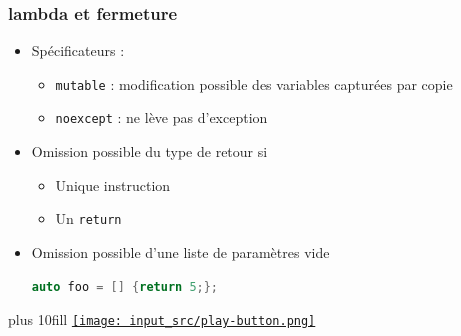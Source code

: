 \documentclass[C++.tex]{subfiles}
\begin{document}
\begin{frame}[fragile]
	\frametitle{lambda et fermeture}
	\begin{itemize}
		\item Spécificateurs :
		\begin{itemize}
			\item \lstinline|mutable| : modification possible des variables capturées par copie
			\item \lstinline|noexcept| : ne lève pas d'exception
		\end{itemize}

		\item Omission possible du type de retour si
		\begin{itemize}
			\item Unique instruction
			\item Un \lstinline|return|
		\end{itemize}
	
	
		\item Omission possible d'une liste de paramètres vide


\begin{lstlisting}[language=C++]
auto foo = [] {return 5;};\end{lstlisting}
	\end{itemize}

	\vskip 10mm plus 10fill
	\hfill
	\href{https://godbolt.org/#g:!((g:!((g:!((h:codeEditor,i:(filename:'1',fontScale:14,fontUsePx:'0',j:1,lang:c%2B%2B,selection:(endColumn:1,endLineNumber:29,positionColumn:1,positionLineNumber:29,selectionStartColumn:1,selectionStartLineNumber:29,startColumn:1,startLineNumber:29),source:'%23include+%3Ciostream%3E%0A%23include+%3Cvector%3E%0A%23include+%3Calgorithm%3E%0A%0Ausing+std::begin%3B%0Ausing+std::end%3B%0A%0Aint+main()%0A%7B%0A++%7B%0A++++int+bar+%3D+4%3B%0A++++auto+foo+%3D+%5B%26bar%5D+(int+a)+-%3E+int+%7B+bar+*%3D+a%3B+return+3+*+a%3B%7D%3B%0A%0A++++std::cout+%3C%3C+foo(5)+%3C%3C+!'+!'+%3C%3C+bar+%3C%3C+!'%5Cn!'%3B%0A++%7D%0A%0A++%7B%0A++++std::vector%3Cint%3E+foo%7B1,+8,+5,+6,+3,+7%7D%3B%0A++++std::vector%3Cint%3E+bar%3B%0A%0A++++std::copy_if(begin(foo),+end(foo),+std::back_inserter(bar),+%5B%5D+(int+i)+%7Breturn+(i%252)+%3D%3D+1%3B%7D)%3B%0A++++for(auto+i+:+bar)%0A++++%7B%0A++++++std::cout+%3C%3C+i+%3C%3C+!'+!'%3B%0A++++%7D%0A++++std::cout+%3C%3C+!'%5Cn!'%3B%0A++%7D%0A%7D%0A'),l:'5',n:'0',o:'C%2B%2B+source+%231',t:'0')),k:50,l:'4',n:'0',o:'',s:0,t:'0'),(g:!((h:executor,i:(argsPanelShown:'1',compilationPanelShown:'0',compiler:g112,compilerOutShown:'0',execArgs:'',execStdin:'',fontScale:14,fontUsePx:'0',j:1,lang:c%2B%2B,libs:!((name:boost,ver:'175')),options:'-std%3Dc%2B%2B11',source:1,stdinPanelShown:'1',tree:'1',wrap:'0'),l:'5',n:'0',o:'Executor+x86-64+gcc+11.2+(C%2B%2B,+Editor+%231)',t:'0')),header:(),k:50,l:'4',n:'0',o:'',s:0,t:'0')),l:'2',n:'0',o:'',t:'0')),version:4}{\texttt{[image: input\_src/play-button.png]}}
\end{frame}
\end{document}
